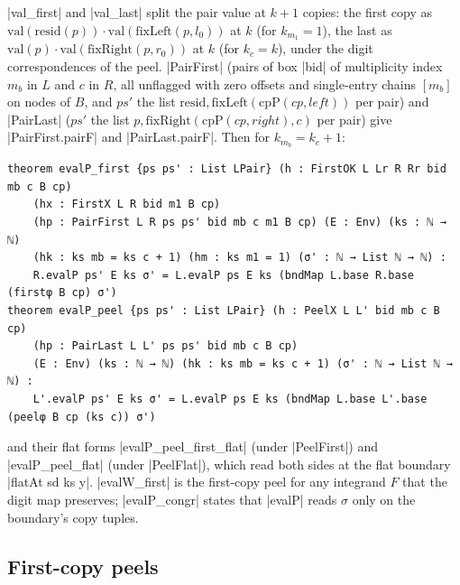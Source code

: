 \begin{theorem}\label{thm:lean-sym-pair-peel}
\lean|val_first| and \lean|val_last| split the pair value at $k+1$ copies: the first copy as $\mathrm{val}(\mathrm{resid}(p))\cdot\mathrm{val}(\mathrm{fixLeft}(p,l_0))$ at $k$ (for $k_{m_1}=1$), the last as $\mathrm{val}(p)\cdot\mathrm{val}(\mathrm{fixRight}(p,r_0))$ at $k$ (for $k_c=k$), under the digit correspondences of the peel. \lean|PairFirst| (pairs of box \lean|bid| of multiplicity index $m_b$ in $L$ and $c$ in $R$, all unflagged with zero offsets and single-entry chains $[m_b]$ on nodes of $B$, and $ps'$ the list $\mathrm{resid},\mathrm{fixLeft}(\mathrm{cpP}(cp,\mathit{left}))$ per pair) and \lean|PairLast| ($ps'$ the list $p,\mathrm{fixRight}(\mathrm{cpP}(cp,\mathit{right}),c)$ per pair) give \lean|PairFirst.pairF| and \lean|PairLast.pairF|. Then for $k_{m_b}=k_c+1$:
\begin{lstlisting}[style=lean]
theorem evalP_first {ps ps' : List LPair} (h : FirstOK L Lr R Rr bid mb c B cp)
    (hx : FirstX L R bid m1 B cp)
    (hp : PairFirst L R ps ps' bid mb c m1 B cp) (E : Env) (ks : ℕ → ℕ)
    (hk : ks mb = ks c + 1) (hm : ks m1 = 1) (σ' : ℕ → List ℕ → ℕ) :
    R.evalP ps' E ks σ' = L.evalP ps E ks (bndMap L.base R.base (firstφ B cp) σ')
theorem evalP_peel {ps ps' : List LPair} (h : PeelX L L' bid mb c B cp)
    (hp : PairLast L L' ps ps' bid mb c B cp)
    (E : Env) (ks : ℕ → ℕ) (hk : ks mb = ks c + 1) (σ' : ℕ → List ℕ → ℕ) :
    L'.evalP ps' E ks σ' = L.evalP ps E ks (bndMap L.base L'.base (peelφ B cp (ks c)) σ')
\end{lstlisting}
and their flat forms \lean|evalP_peel_first_flat| (under \lean|PeelFirst|) and \lean|evalP_peel_flat| (under \lean|PeelFlat|), which read both sides at the flat boundary \lean|flatAt sd ks y|. \lean|evalW_first| is the first-copy peel for any integrand $F$ that the digit map preserves; \lean|evalP_congr| states that \lean|evalP| reads $\sigma$ only on the boundary's copy tuples.
\end{theorem}

\subsection{First-copy peels}

